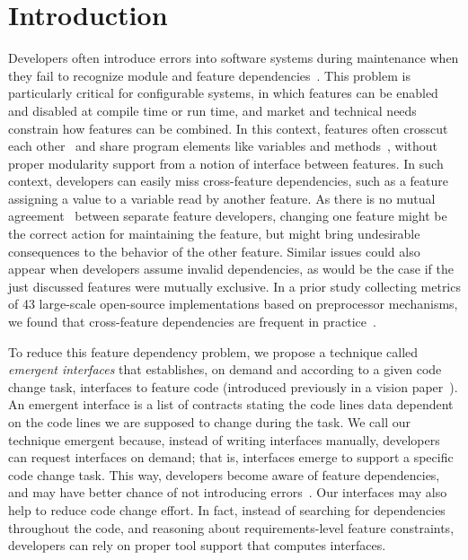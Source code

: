 
\section{Introduction}

Developers often introduce errors into software systems during maintenance when they fail to recognize module and feature dependencies~\cite{herbsleb-feature-dependencies-icse11}. This problem is particularly critical for configurable systems, in which features can be enabled and disabled at compile time or run time, and market and technical needs constrain how features can be combined. In this context, features often crosscut each other~\cite{liebig-40spls-icse10} and share program elements like variables and methods~\cite{ribeiro-feature-dependencies-gpce11}, without proper modularity support from a notion of interface between features. In such context, developers can easily miss cross-feature dependencies, such as  a feature assigning a value to a variable read by another feature. As there is no mutual agreement~\cite{mary-shaw-global-variable-harmful-73} between separate feature developers, changing one feature might be the correct action for maintaining the feature, but might bring undesirable consequences to the behavior of the other feature. Similar issues could also appear when developers assume invalid dependencies, as would be the case if the just discussed features were mutually exclusive. In a prior study collecting metrics of 43 large-scale open-source implementations based on preprocessor mechanisms, we found that cross-feature dependencies are frequent in practice~\cite{ribeiro-feature-dependencies-gpce11}.

To reduce this feature dependency problem, we propose a technique called \emph{emergent interfaces} that establishes, on demand and according to a given code change task, interfaces to feature code (introduced previously in a vision paper~\cite{ribeiro-emergent-onward10}). An emergent interface is a list of contracts stating the code lines data dependent on the code lines we are supposed to change during the task. We call our technique emergent because, instead of writing interfaces manually, developers can request interfaces on demand; that is, interfaces emerge to support a specific code change task.
This way, developers become aware of feature dependencies, and may have better chance of not introducing errors~\cite{yin-fixes-become-bugs-fse11}. Our interfaces may also help to reduce code change effort. In fact, instead of searching for dependencies throughout the code, and reasoning about requirements-level feature constraints, developers can rely on proper tool support that computes interfaces.

